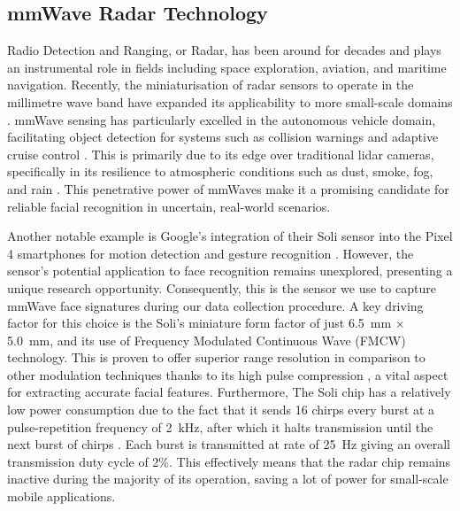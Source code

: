 \documentclass{mpaper}
\begin{document}
\subsection{mmWave Radar Technology}
Radio Detection and Ranging, or Radar, has been around for decades and plays an instrumental role in fields including space exploration, aviation, and maritime navigation. Recently, the miniaturisation of radar sensors to operate in the millimetre wave band have expanded its applicability to more small-scale domains \cite{soumya2023recent}. mmWave sensing has particularly excelled in the autonomous vehicle domain, facilitating object detection for systems such as collision warnings and adaptive cruise control \cite{dfrobot}. This is primarily due to its edge over traditional lidar cameras, specifically in its resilience to atmospheric conditions such as dust, smoke, fog, and rain \cite{cadenceblog2022}. This penetrative power of mmWaves make it a promising candidate for reliable facial recognition in uncertain, real-world scenarios. 

Another notable example is Google's integration of their Soli sensor into the Pixel 4 smartphones for motion detection and gesture recognition \cite{googleblog2020}. However, the sensor's potential application to face recognition remains unexplored, presenting a unique research opportunity. Consequently, this is the sensor we use to capture mmWave face signatures during our data collection procedure. A key driving factor for this choice is the Soli's miniature form factor of just \qty{6.5}{\mm} $\times$ \qty{5.0}{\mm}, and its use of Frequency Modulated Continuous Wave (FMCW) technology. This is proven to offer superior range resolution in comparison to other modulation techniques thanks to its high pulse compression \cite{mahafza2005radar}, a vital aspect for extracting accurate facial features. Furthermore, The Soli chip has a relatively low power consumption due to the fact that it sends 16 chirps every burst at a pulse-repetition frequency of \qty{2}{\kHz}, after which it halts transmission until the next burst of chirps \cite{hayashi2021radarnet, mitchell2023mmsense}. Each burst is transmitted at rate of \qty{25}{\Hz} giving an overall transmission duty cycle of 2\%. This effectively means that the radar chip remains inactive during the majority of its operation, saving a lot of power for small-scale mobile applications.
\end{document}
